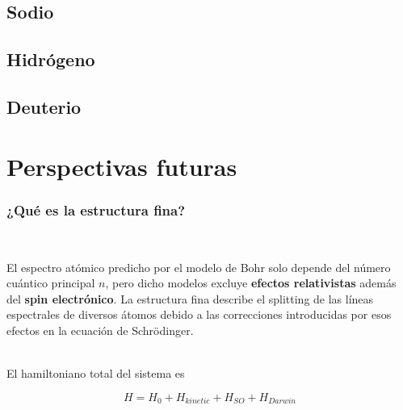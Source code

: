 \documentclass{beamer}
\begin{document}
\subsection{Sodio}

\subsection{Hidrógeno}

\subsection{Deuterio}

\section{Perspectivas futuras}

\begin{frame}
\frametitle{¿Qué es la estructura fina?}
\ 


El espectro atómico predicho por el modelo de Bohr solo depende del número cuántico principal $n$, pero dicho modelos excluye \textbf{efectos relativistas} además del \textbf{spin electrónico}. La estructura fina describe el splitting de las líneas espectrales de diversos átomos debido a las correcciones introducidas por esos efectos en la ecuación de Schrödinger. \\\

El hamiltoniano total del sistema es

\begin{equation}
H = H_{0} + H_{kinetic} + H_{SO} + H_{Darwin}
\end{equation}
\end{frame}

\end{document}
